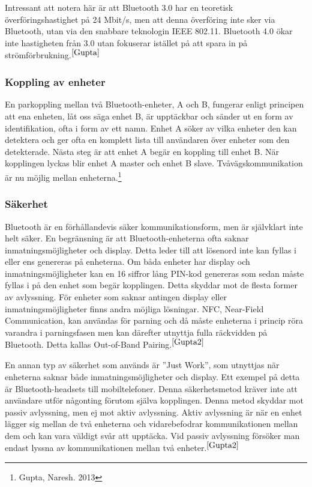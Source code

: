 \documentclass[a4paper,12pt,fleqn]{article}
\begin{document}
Intressant att notera här är att Bluetooth 3.0 har en teoretisk överföringshastighet på 24 Mbit/s, men att denna överföring inte sker via Bluetooth, utan via den snabbare teknologin IEEE 802.11. 
Bluetooth 4.0 ökar inte hastigheten från 3.0 utan fokuserar istället på att spara in på strömförbrukning.$^{\ref{Gupta}}$


\subsubsection{Koppling av enheter}
En parkoppling mellan två Bluetooth-enheter, A och B, fungerar enligt principen att ena enheten, låt oss säga enhet B, är upptäckbar och sänder ut en form av identifikation, ofta i form av ett namn. Enhet A söker av vilka enheter den kan detektera och ger ofta en komplett lista till användaren över enheter som den detekterade. Nästa steg är att enhet A begär en koppling till enhet B. När kopplingen lyckas blir enhet A master och enhet B slave. Tvåvägskommunikation är nu möjlig mellan enheterna.\footnote{\label{Gupta2}Gupta, Naresh. 2013}

\subsubsection{Säkerhet}
Bluetooth är en förhållandevis säker kommunikationsform, men är självklart inte helt säker. En begränsning är att Bluetooth-enheterna ofta saknar inmatningsmöjligheter och display. Detta leder till att lösenord inte kan fyllas i eller ens genereras på enheterna. Om båda enheter har display och inmatningsmöjligheter kan en 16 siffror lång PIN-kod genereras som sedan måste fyllas i på den enhet som begär kopplingen. Detta skyddar mot de flesta former av avlyssning.
För enheter som saknar antingen display eller inmatningsmöjligheter finns andra möjliga lösningar. NFC, Near-Field Communication, kan användas för parning och då måste enheterna i princip röra varandra i parningsfasen men kan därefter utnyttja fulla räckvidden på Bluetooth. Detta kallas Out-of-Band Pairing.$^{\ref{Gupta2}}$

En annan typ av säkerhet som används är ''Just Work'', som utnyttjas när enheterna saknar både inmatningsmöjligheter och display. Ett exempel på detta är Bluetooth-headsets till mobiltelefoner. Denna säkerhetsmetod kräver inte att användare utför någonting förutom själva kopplingen. Denna metod skyddar mot passiv avlyssning, men ej mot aktiv avlyssning. 
Aktiv avlyssning är när en enhet lägger sig mellan de två enheterna och vidarebefodrar kommunikationen mellan dem och kan vara väldigt svår att upptäcka.
Vid passiv avlyssning försöker man endast lyssna av kommunikationen mellan två enheter.$^{\ref{Gupta2}}$
\end{document}
